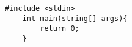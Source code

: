 \documentclass{article}
\begin{document}
	\begin{lstlisting}[caption=blabla, label=amb]
	#include <stdin>
	int main(string[] args){
		return 0;
	}
	\end{lstlisting}
	\begin{figure}
	\end{figure}
\end{document}
